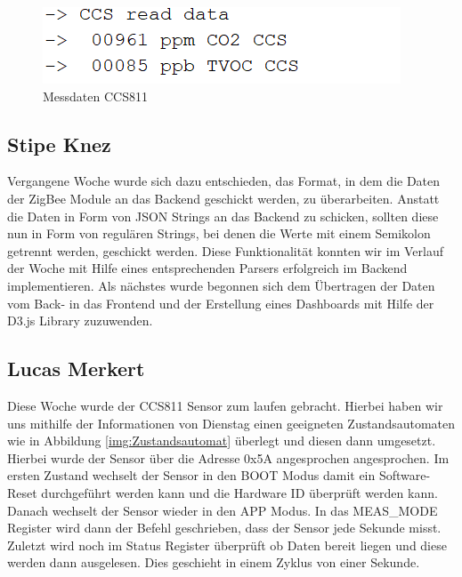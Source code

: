 \documentclass[]{article}
\begin{document}
\begin{figure}[!h]
	\centering
	\includegraphics[scale=0.60]{images/CCS811_data}
	\caption{Messdaten CCS811}
	\label{img:CCS811_data}
\end{figure}





\subsection{Stipe Knez}
Vergangene Woche wurde sich dazu entschieden, das Format, in dem die Daten der ZigBee Module an das Backend geschickt werden, zu überarbeiten. Anstatt die Daten in Form von JSON Strings an das Backend zu schicken, sollten diese nun in Form von regulären Strings, bei denen die Werte mit einem Semikolon getrennt werden, geschickt werden. Diese Funktionalität konnten wir im Verlauf der Woche mit Hilfe eines entsprechenden Parsers erfolgreich im Backend implementieren. Als nächstes wurde begonnen sich dem Übertragen der Daten vom Back- in das Frontend und der Erstellung eines Dashboards mit Hilfe der D3.js Library zuzuwenden.
\subsection{Lucas Merkert}
Diese Woche wurde der CCS811 Sensor\cite{datasheetcss811} zum laufen gebracht. Hierbei haben wir uns mithilfe der Informationen von Dienstag einen geeigneten Zustandsautomaten wie in Abbildung \ref{img:Zustandsautomat} überlegt und diesen dann umgesetzt. Hierbei wurde der Sensor über die Adresse 0x5A angesprochen angesprochen. Im ersten Zustand wechselt der Sensor in den BOOT Modus damit ein Software-Reset durchgeführt werden kann und die Hardware ID überprüft werden kann. Danach wechselt der Sensor wieder in den APP Modus. In das MEAS\_MODE Register wird dann der Befehl geschrieben, dass der Sensor jede Sekunde misst. Zuletzt wird noch im Status Register überprüft ob Daten bereit liegen und diese werden dann ausgelesen. Dies geschieht in einem Zyklus von einer Sekunde.
\end{document}
